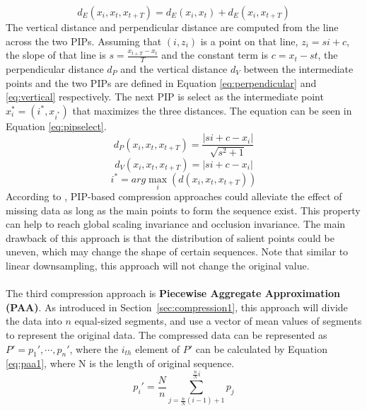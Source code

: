 \begin{equation}
    \label{eq:euclideandoulbe}
    d_E(x_i, x_t, x_{t+T}) = d_E(x_i, x_t) + d_E(x_i, x_{t+T})
\end{equation}
The vertical distance and perpendicular distance are computed from the line across the two PIPs. Assuming that $(i,z_i)$ is a point on that line, $z_i = si+c$, the slope of that line is $s = \frac{x_{t+T} - x_t}{T}$ and the constant term is $c = x_t - st$, the perpendicular distance $d_P$ and the vertical distance $d_V$ between the intermediate points and the two PIPs are defined in Equation \ref{eq:perpendicular} and \ref{eq:vertical} respectively. The next PIP is select as the intermediate point $x_i^* = (i^*, x_{i^*})$ that maximizes the three distances. The equation can be seen in Equation \ref{eq:pipselect}.
\begin{equation}
    \label{eq:perpendicular}
    d_P(x_i, x_t, x_{t+T}) = \frac{|si+c-x_i|}{\sqrt{s^2+1}}
\end{equation}
\begin{equation}
    \label{eq:vertical}
    d_V(x_i, x_t, x_{t+T}) = |si+c-x_i|
\end{equation}
\begin{equation}
    \label{eq:pipselect}
    i^* = arg\max_i(d(x_i, x_t, x_{t+T}))
\end{equation}
According to \cite{zaib2004pattern}, PIP-based compression approaches could alleviate the effect of missing data as long as the main points to form the sequence exist. This property can help to reach global scaling invariance and occlusion invariance. The main drawback of this approach is that the distribution of salient points could be uneven, which may change the shape of certain sequences. Note that similar to linear downsampling, this approach will not change the original value.\\
\\ The third compression approach is \textbf{Piecewise Aggregate Approximation (PAA)}. As introduced in Section~\ref{sec:compression1}, this approach will divide the data into $n$ equal-sized segments, and use a vector of mean values of segments to represent the original data. The compressed data can be represented as $P\prime = {p_1\prime, \cdots, p_n\prime}$, where the $i_{th}$ element of $P\prime$ can be calculated by Equation \ref{eq:paa1}, where N is the length of original sequence.
\begin{equation}
    \label{eq:paa1}
    p_i\prime = \frac{N}{n} \sum_{j=\frac{n}{N}(i-1)+1}^{\frac{n}{N}i} p_j
\end{equation}

